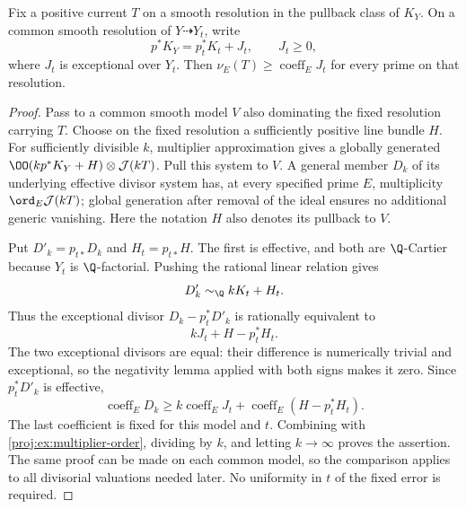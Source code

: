 \begin{lemma}\label{proj:ex:current-comparison}
Fix a positive current \(T\) on a smooth resolution in the
pullback class of \(K_Y\). On a common smooth resolution of
\(Y\dashrightarrow Y_t\), write
\[
 p^*K_Y=p_t^*K_t+J_t,\qquad J_t\geq0,
\]
where \(J_t\) is exceptional over \(Y_t\).
Then \(\nu_E(T)\geq\operatorname{coeff}_E J_t\) for every
prime on that resolution.
\end{lemma}
\begin{proof}
Pass to a common smooth model \(V\) also dominating the
fixed resolution carrying \(T\). Choose on the fixed
resolution a sufficiently positive line bundle \(H\).
For sufficiently divisible \(k\), multiplier approximation
gives a globally generated
\(\OO(kp^*K_Y+H)\otimes\mathcal J(kT)\).
Pull this system to \(V\). A general member \(D_k\) of its
underlying effective divisor system has, at every specified
prime \(E\), multiplicity
\(\ord_E\mathcal J(kT)\); global generation after removal
of the ideal ensures no additional generic vanishing.
Here the notation \(H\) also denotes its pullback to \(V\).

Put \(D'_k=p_{t*}D_k\) and \(H_t=p_{t*}H\). The first is
effective, and both are \(\Q\)-Cartier because \(Y_t\) is
\(\Q\)-factorial. Pushing the rational linear relation gives
\[
 D'_k\sim_\Q kK_t+H_t.
\]
Thus the exceptional divisor
\(D_k-p_t^*D'_k\) is rationally equivalent to
\[
 kJ_t+H-p_t^*H_t.
\]
The two exceptional divisors are equal: their difference is
numerically trivial and exceptional, so the negativity lemma
applied with both signs makes it zero. Since
\(p_t^*D'_k\) is effective,
\[
 \operatorname{coeff}_E D_k
 \geq k\operatorname{coeff}_E J_t
       +\operatorname{coeff}_E(H-p_t^*H_t).
 \]
The last coefficient is fixed for this model and \(t\).
Combining with \eqref{proj:ex:multiplier-order}, dividing by
\(k\), and letting \(k\to\infty\) proves the assertion.
The same proof can be made on each common model, so the
comparison applies to all divisorial valuations needed
later. No uniformity in \(t\) of the fixed error is required.
\end{proof}

